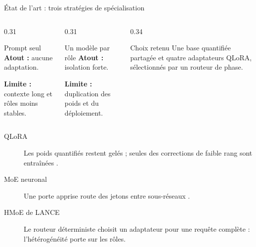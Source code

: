 \documentclass[aspectratio=169,10pt]{beamer}
\begin{document}
\begin{frame}{État de l'art : trois stratégies de spécialisation}
  \begin{columns}[T,onlytextwidth]
    \begin{column}{0.31\textwidth}
      \begin{block}{Prompt seul}
        \textbf{Atout :} aucune adaptation.\par
        \vspace{0.35em}
        \textbf{Limite :} contexte long et rôles moins stables.
      \end{block}
    \end{column}
    \begin{column}{0.31\textwidth}
      \begin{block}{Un modèle par rôle}
        \textbf{Atout :} isolation forte.\par
        \vspace{0.35em}
        \textbf{Limite :} duplication des poids et du déploiement.
      \end{block}
    \end{column}
    \begin{column}{0.34\textwidth}
      \begin{exampleblock}{Choix retenu}
        Une base quantifiée partagée et quatre adaptateurs QLoRA, sélectionnés
        par un routeur de phase.
      \end{exampleblock}
    \end{column}
  \end{columns}

  \vspace{0.7em}
  \begin{description}
    \item[QLoRA] Les poids quantifiés restent gelés ; seules des corrections de
      faible rang sont entraînées \cite{dettmers2023qlora}.
    \item[MoE neuronal] Une porte apprise route des jetons entre sous-réseaux
      \cite{shazeer2017moe}.
    \item[HMoE de LANCE] Le routeur déterministe choisit un adaptateur pour une
      requête complète : l'hétérogénéité porte sur les rôles.
  \end{description}
\end{frame}
\end{document}
